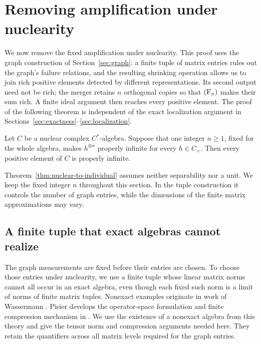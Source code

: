 \section{Removing amplification under nuclearity}\label{sec:nuclear}

We now remove the fixed amplification under nuclearity.  This proof
uses the graph construction of Section~\ref{sec:graph}: a finite tuple
of matrix entries rules out the graph's failure relations, and the
resulting shrinking operation allows us to join rich positive
elements detected by different representations.  Its second output
need not be rich; the merger retains \(n\) orthogonal copies so that
\(\textup{(F\ensuremath{_n})}\) makes their sum rich.  A finite ideal argument then reaches every positive
element.  The proof of the following theorem is
independent of the exact localization argument in
Sections~\ref{sec:exactness}--\ref{sec:localization}.

\begin{theorem}
\label{thm:nuclear-to-individual}
Let \(C\) be a nuclear complex \(C^*\)-algebra.  Suppose that one
integer \(n\ge1\), fixed for the whole algebra, makes
\(h^{\oplus n}\) properly infinite for every \(h\in C_+\).
Then every positive element of \(C\) is properly infinite.
\end{theorem}

Theorem~\ref{thm:nuclear-to-individual} assumes neither separability
nor a unit.  We keep the fixed integer \(n\) throughout this section.
In the tuple construction it controls the number of graph entries,
while the dimensions of the finite matrix approximations may vary.

\subsection{A finite tuple that exact algebras cannot realize}

The graph measurements are fixed before their entries are chosen.
To choose those entries under nuclearity, we use a finite tuple whose
linear matrix norms cannot all occur in an exact algebra, even though
each fixed such norm is a limit of norms of finite matrix tuples.
Nonexact examples originate in work of Wassermann
\cite{Wassermann1976}.  Pisier develops the operator-space formulation
and finite compression mechanism in
\cite[Theorems~1 and~7, Lemma~2 and Equation~(7)]{Pisier1995}.
We use the existence of a nonexact algebra from this theory and give
the tensor norm and compression arguments needed here.  They retain
the quantifiers across all matrix levels required for the graph entries.

